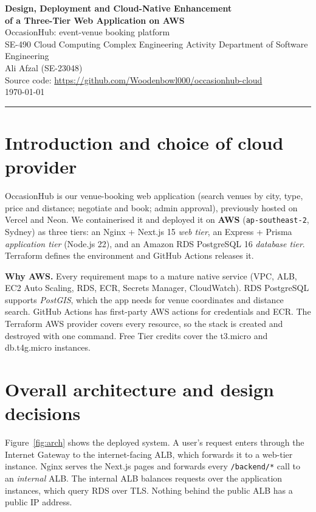 \documentclass[10pt,a4paper]{article}
\newcommand{\student}{Ali Afzal (SE-23048)}
\newcommand{\repourl}{\url{https://github.com/Woodenbowl000/occasionhub-cloud}}
\begin{document}
\begin{center}
{\LARGE\bfseries Design, Deployment and Cloud-Native Enhancement\\[2pt]
of a Three-Tier Web Application on AWS}\\[6pt]
{\large OccasionHub: event-venue booking platform}\\[8pt]
SE-490 Cloud Computing \textperiodcentered{} Complex Engineering Activity
\textperiodcentered{} Department of Software Engineering\\[3pt]
\student\\[3pt]
Source code: \repourl\\[2pt]
\today
\end{center}
\vspace{-0.4em}
\noindent\rule{\linewidth}{0.4pt}

\section{Introduction and choice of cloud provider}
OccasionHub is our venue-booking web application (search venues by city, type,
price and distance; negotiate and book; admin approval), previously hosted on
Vercel and Neon. We containerised it and deployed it on \textbf{AWS}
(\texttt{ap-southeast-2}, Sydney) as three tiers: an Nginx + Next.js 15 \emph{web tier}, an
Express + Prisma \emph{application tier} (Node.js 22), and an Amazon RDS
PostgreSQL 16 \emph{database tier}. Terraform defines the environment and GitHub
Actions releases it.

\textbf{Why AWS.} Every requirement maps to a mature native service (VPC, ALB,
EC2 Auto Scaling, RDS, ECR, Secrets Manager, CloudWatch). RDS PostgreSQL supports
\emph{PostGIS}, which the app needs for venue coordinates and distance search.
GitHub Actions has first-party AWS actions for credentials and ECR.
The Terraform AWS provider covers every resource, so the stack is created and
destroyed with one command. Free Tier credits cover the t3.micro and
db.t4g.micro instances.

\section{Overall architecture and design decisions}
Figure~\ref{fig:arch} shows the deployed system. A user's request enters
through the Internet Gateway to the internet-facing ALB, which forwards it to a
web-tier instance. Nginx serves the Next.js pages and forwards every
\texttt{/backend/*} call to an \emph{internal} ALB. The internal ALB balances
requests over the application instances, which query RDS over TLS. Nothing
behind the public ALB has a public IP address.
\end{document}
